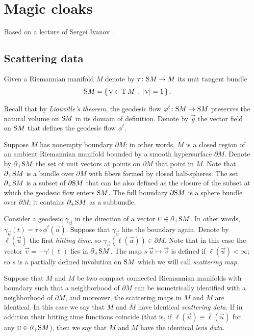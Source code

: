 \chapter{Magic cloaks}

Based on a lecture of Sergei Ivanov \cite{ivanov-2012}.

\section{Scattering data}

Given a Riemannian manifold $M$ denote by $\tau\:\S M\to M$ its unit tangent bundle
\[\S M=\set{\vec v\in \T M}{|\vec v|=1}.\]

Recall that by \emph{Liouville's theorem}, the geodesic flow $\phi^t\:\S M\z\to \S M$ preserves the natural volume on $\S M$ in its domain of definition.
Denote by $\vec g$ the vector field on $\S M$ that defines the geodesic flow $\phi^t$.

Suppose $M$ has nonempty boundary $\partial M$;
in other words, $M$ is a closed region of an ambient Riemannian  manifold bounded by a smooth hypersurface $\partial M$.
Denote by $\partial_+\S  M$ the set of unit vectors at points on $\partial M$ that point in $M$.
Note that $\partial_+\S  M$ is a bundle over $\partial M$ with fibers formed by closed half-spheres.
The set $\partial_+ \S M$ is a subset of $\partial \S M$ that can be also defined as the closure of the subset at which the geodesic flow enters $\S M$.
The full boundary $\partial\S M$ is a sphere bundle over $\partial M$;
it contains $\partial_+ \S M$ as a subbundle.


Consider a geodesic $\gamma_{\vec u}$ in the direction of a vector $\vec u\in \partial_+\S  M$.
In other words, $\gamma_{\vec u}(t)=\tau\circ \phi^t(\vec u)$.
Suppose that $\gamma_{\vec u}$ hits the boundary again.
Denote by $\ell(\vec u)$ the first \emph{hitting time}, so $\gamma_{\vec u}(\ell(\vec u))\in \partial M$.
Note that in this case the vector $\vec v=-\gamma'(\ell)$ lies in $\partial_+\S  M$.
The map $s\:\vec u\mapsto \vec v$ is defined if $\ell(\vec u)<\infty$;
so $s$ is a partially defined involution on $\S M$ which we will call \emph{scattering map}.

Suppose that $M$ and $\bar M$ be two compact connected Riemannian manifolds with boundary such that a neighborhood of $\partial M$ can be isometrically identified with a neighborhood of $\partial \bar M$,
and moreover, the scattering maps in $M$ and $\bar M$ are identical.
In this case we say that $M$ and $\bar M$ have identical  \emph{scattering data}.
If in addition their hitting time functions  coincide (that is, if $\ell(\vec u)\equiv\bar\ell(\vec u)$ for any $\vec u\in \partial_+ \S M$), then we say that $M$ and $\bar M$ have the identical \emph{lens data}.

